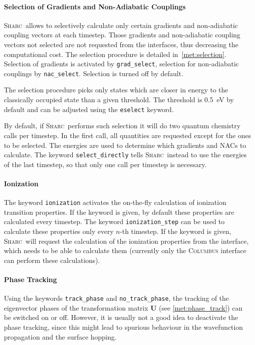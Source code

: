\documentclass[a4paper,11pt,DIV=15,openany,twoside=false]{scrbook}
\newcommand{\sharc}{\textsc{Sharc}}
\newcommand{\ttt}[1]{\texttt{#1}}
\begin{document}
\paragraph{Selection of Gradients and Non-Adiabatic Couplings}

\sharc\ allows to selectively calculate only certain gradients and non-adiabatic coupling vectors at each timestep. Those gradients and non-adiabatic coupling vectors not selected are not requested from the interfaces, thus decreasing the computational cost. The selection procedure is detailed in~\ref{met:selection}.
Selection of gradients is activated by \ttt{grad\_select}, selection for non-adiabatic couplings by \ttt{nac\_select}. Selection is turned off by default. 

The selection procedure picks only states which are closer in energy to the classically occupied state than a given threshold. The threshold is 0.5~eV by default and can be adjusted using the \ttt{eselect} keyword.

By default, if \sharc\ performs such selection it will do two quantum chemistry calls per timestep. In the first call, all quantities are requested except for the ones to be selected. The energies are used to determine which gradients and NACs to calculate. The keyword \ttt{select\_directly} tells \sharc\ instead to use the energies of the last timestep, so that only one call per timestep is necessary.

\paragraph{Ionization}

The keyword \ttt{ionization} activates the on-the-fly calculation of ionization transition properties. If the keyword is given, by default these properties are calculated every timestep. The keyword \ttt{ionization\_step} can be used to calculate these properties only every $n$-th timestep. 
If the keyword is given, \sharc\ will request the calculation of the ionization properties from the interface, which needs to be able to calculate them (currently only the \textsc{Columbus} interface can perform these calculations).

\paragraph{Phase Tracking}

Using the keywords \ttt{track\_phase} and \ttt{no\_track\_phase}, the tracking of the eigenvector phases of the transformation matrix $\mathbf{U}$ (see \ref{met:phase_track}) can be switched on or off. However, it is usually not a good idea to deactivate the phase tracking, since this might lead to spurious behaviour in the wavefunction propagation and the surface hopping.
\end{document}
